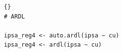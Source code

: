 
%	
%			
%			
%	
%
\begin{lstlisting}[title={‘Código R: Ejemplo Modelo IPSA - CU - S$\&$P},basicstyle=\ttfamily]{}
# ARDL

ipsa_reg4 <- auto.ardl(ipsa ~ cu)
ipsa_reg4 <- ardl(ipsa ~ cu)
\end{lstlisting}


